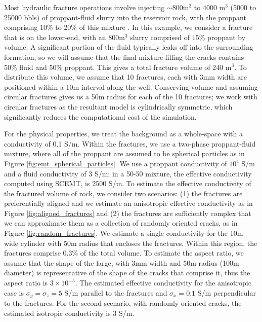 Most hydraulic fracture operations involve injecting $\sim$800m$^3$ to 4000 m$^3$ (5000 to 25000 bbls) of proppant-fluid slurry into the reservoir rock, with the proppant comprising 10\% to 20\% of this mixture \citep{Hoversten2015}. In this example, we consider a fracture that is on the lower-end, with an 800m$^3$ slurry comprised of $15\%$ proppant by volume. A significant portion of the fluid typically leaks off into the surrounding formation, so we will assume that the final mixture filling the cracks contains 50\% fluid and 50\% proppant. This gives a total fracture volume of 240 m$^3$. To distribute this volume, we assume that 10 fractures, each with 3mm width are positioned within a 10m interval along the well. Conserving volume and assuming circular fractures gives us a 50m radius for each of the 10 fractures; we work with circular fractures as the resultant model is cylindrically symmetric, which significantly reduces the computational cost of the simulation.



For the physical properties, we treat the background as a whole-space with a conductivity of 0.1 S/m. Within the fractures, we use a two-phase proppant-fluid mixture, where all of the proppant are assumed to be spherical particles as in Figure \ref{fig:emt_spherical_particles}. We use a proppant conductivity of $10^4$ S/m and a fluid conductivity of 3 S/m; in a 50-50 mixture, the effective conductivity computed using SCEMT, is 2500 S/m. To estimate the effective conductivity of the fractured volume of rock, we consider two scenarios: (1) the fractures are preferentially aligned and we estimate an anisotropic effective conductivity as in Figure \ref{fig:aligned_fractures} and (2) the fractures are sufficiently complex that we can approximate them as a collection of randomly oriented cracks, as in Figure \ref{fig:random_fractures}. We estimate a single conductivity for the 10m wide cylinder with 50m radius that encloses the fractures. Within this region, the fractures comprise 0.3\% of the total volume. To estimate the aspect ratio, we assume that the shape of the large, with 3mm width and 50m radius (100m diameter) is representative of the shape of the cracks that comprise it, thus the aspect ratio is $3\times10^{-5}$. The estimated effective conductivity for the anisotropic case is $\sigma_y = \sigma_z = 5$ S/m parallel to the fractures and $\sigma_x = 0.1$ S/m perpendicular to the fractures. For the second scenario, with randomly oriented cracks, the estimated isotropic conductivity is 3 S/m.


